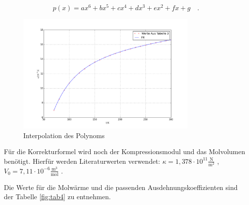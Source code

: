\begin{equation*}
p(x)=ax^6+bx^5+cx^4+dx^3+ex^2+fx+g\quad.
\end{equation*}

\begin{figure}
	\centering
		\includegraphics[width=0.8\textwidth]{inter.png}
	\caption{Interpolation des Polynoms}
	\label{fig:abb1}
\end{figure}

\noindent Für die Korrekturformel wird noch der Kompressionsmodul und das Molvolumen benötigt. Hierfür werden Literaturwerten verwendet: \(\kappa=1,378\cdot10^{11}\frac{\text{N}}{\text{m}^2}\) \cite{cu}, \(V_0=7,11\cdot10^{-6}\frac{\text{m}^3}{\text{mol}}\) \cite{v47}. 

\noindent Die Werte für die Molwärme und die passenden Ausdehnungskoeffizienten sind der Tabelle \ref{fig:tab4} zu entnehmen.

